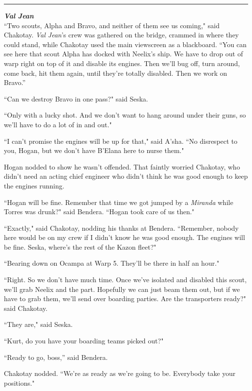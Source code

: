\documentclass[twoside,letterpaper,12pt]{memoir}
\begin{document}
\begin{center}\rule{3cm}{0.4 pt}\end{center}

\noindent\textit{\textbf{Val Jean}}\\

``Two scouts, Alpha and Bravo, and neither of them see us coming," said Chakotay. \textit{Val Jean}'s crew was gathered on the bridge, crammed in where they could stand, while Chakotay used the main viewscreen as a blackboard. ``You can see here that scout Alpha has docked with Neelix's ship. We have to drop out of warp right on top of it and disable its engines. Then we'll bug off, turn around, come back, hit them again, until they’re totally disabled. Then we work on Bravo.”

``Can we destroy Bravo in one pass?" said Seska.

``Only with a lucky shot. And we don't want to hang around under their guns, so we'll have to do a lot of in and out."

``I can't promise the engines will be up for that," said A'sha. ``No disrespect to you, Hogan, but we don't have B'Elana here to nurse them."

Hogan nodded to show he wasn't offended. That faintly worried Chakotay, who didn't need an acting chief engineer who didn't think he was good enough to keep the engines running.

``Hogan will be fine. Remember that time we got jumped by a \textit{Miranda} while Torres was drunk?" said Bendera. ``Hogan took care of us then."

``Exactly," said Chakotay, nodding his thanks at Bendera. ``Remember, nobody here would be on my crew if I didn't know he was good enough. The engines will be fine. Seska, where's the rest of the Kazon fleet?"

``Bearing down on Ocampa at Warp 5. They'll be there in half an hour."

``Right. So we don't have much time. Once we've isolated and disabled this scout, we'll grab Neelix and the part. Hopefully we can just beam them out, but if we have to grab them, we'll send over boarding parties. Are the transporters ready?" said Chakotay.

``They are," said Seska.

``Kurt, do you have your boarding teams picked out?"

``Ready to go, boss,” said Bendera.

Chakotay nodded. ``We're as ready as we're going to be. Everybody take your positions."
\end{document}
